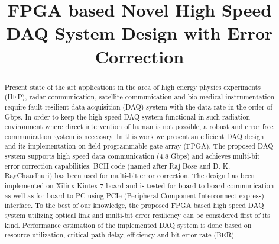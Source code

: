 \documentclass[10pt, conference, compsocconf]{IEEEtran}
\begin{document}
\title{FPGA based Novel High Speed DAQ System Design with Error Correction}










\author{

}


\maketitle
\begin{abstract}


Present state of the art applications in the area of high energy physics experiments (HEP), radar communication, satellite communication and bio medical instrumentation require fault resilient data acquisition (DAQ) system with the data rate in the order of Gbps. In order to keep the high speed DAQ system functional in such radiation environment where direct intervention of human is not possible, a robust and error free communication system is necessary. In this work we present an efficient DAQ design and its implementation on field programmable gate array (FPGA). The proposed DAQ system supports high speed data communication (4.8 Gbps) and achieves multi-bit error correction capabilities. BCH code (named after Raj Bose and D. K. RayChaudhuri) has been used for multi-bit error correction. The design has been implemented on Xilinx Kintex-7 board and is tested for board to board communication as well as for board to PC using PCIe (Peripheral Component Interconnect express) interface. To the best of our knowledge, the proposed FPGA based high speed DAQ system utilizing optical link and multi-bit error resiliency can be considered first of its kind. Performance estimation of the implemented DAQ system is done based on resource utilization, critical path delay, efficiency and bit error rate (BER).
\end{abstract}
\end{document}
